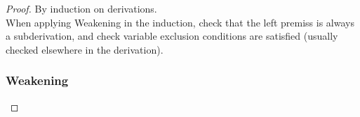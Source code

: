 \documentclass[11pt]{article}
\begin{document}
    \begin{proof}
        By induction on derivations. \\
        When applying Weakening in the induction, check that the left premiss is always a subderivation,
        and check variable exclusion conditions are satisfied (usually checked elsewhere in the derivation). \\
        \begin{landscape}
        \subsubsection*{Weakening}
        \begin{mathpar}
\end{mathpar}
\end{landscape}
\end{proof}
\end{document}
